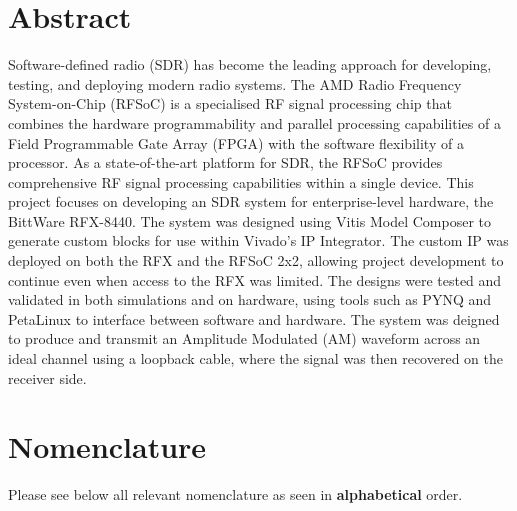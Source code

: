 \documentclass[12pt, a4paper]{article}
\begin{document}
\newpage

\section*{Abstract}

Software-defined radio (SDR) has become the leading approach for developing, testing, and deploying modern radio systems. The AMD Radio Frequency System-on-Chip (RFSoC) is a specialised RF signal processing chip that combines the hardware programmability and parallel processing capabilities of a Field Programmable Gate Array (FPGA) with the software flexibility of a processor. As a state-of-the-art platform for SDR, the RFSoC provides comprehensive RF signal processing capabilities within a single device. This project focuses on developing an SDR system for enterprise-level hardware, the BittWare RFX-8440. The system was designed using Vitis Model Composer to generate custom blocks for use within Vivado's IP Integrator. The custom IP was deployed on both the RFX and the RFSoC 2x2, allowing project development to continue even when access to the RFX was limited. The designs were tested and validated in both simulations and on hardware, using tools such as PYNQ and PetaLinux to interface between software and hardware. The system was deigned to produce and transmit an Amplitude Modulated (AM) waveform across an ideal channel using a loopback cable, where the signal was then recovered on the receiver side.

\newpage
\tableofcontents
\newpage



\section*{Nomenclature}
Please see below all relevant nomenclature as seen in \textbf{alphabetical} order.
\end{document}
